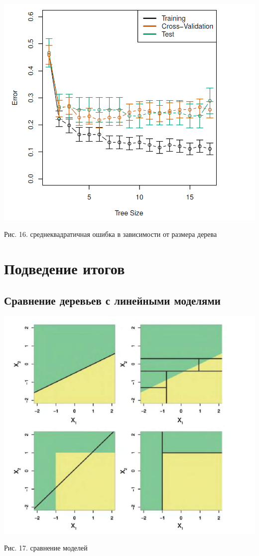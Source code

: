 \documentclass{article}
\begin{document}
\begin{center}
	\includegraphics[scale=0.3]{pic73}
\end{center}
\begin{center}
	Рис. 16. среднеквадратичная ошибка в зависимости от размера дерева
\end{center}

\newpage

\section{Подведение итогов}

\subsection{Сравнение деревьев с линейными моделями}

\begin{center}
	\includegraphics[scale=0.5]{pic10}
\end{center}
\begin{center}
	Рис. 17. сравнение моделей
\end{center}
\end{document}
